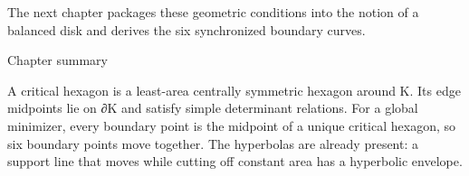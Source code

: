 The next chapter packages these geometric conditions into the notion of a balanced disk and derives the six synchronized boundary curves.


\begin{insightbox}{Chapter summary}
\end{insightbox}

A critical hexagon is a least-area centrally symmetric hexagon around K. Its edge midpoints lie on ∂K and satisfy simple determinant relations. For a global minimizer, every boundary point is the midpoint of a unique critical hexagon, so six boundary points move together. The hyperbolas are already present: a support line that moves while cutting off constant area has a hyperbolic envelope.

